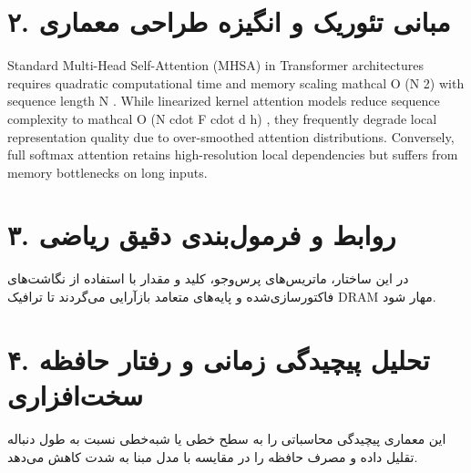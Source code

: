 \documentclass[12pt,a4paper]{article}
\begin{document}
\section*{۲. مبانی تئوریک و انگیزه طراحی معماری}
Standard Multi-Head Self-Attention (MHSA) in Transformer architectures requires quadratic computational time and memory scaling mathcal O (N 2) with sequence length N . While linearized kernel attention models reduce sequence complexity to mathcal O (N cdot F cdot d h) , they frequently degrade local representation quality due to over-smoothed attention distributions. Conversely, full softmax attention retains high-resolution local dependencies but suffers from memory bottlenecks on long inputs.

\section*{۳. روابط و فرمول‌بندی دقیق ریاضی}
در این ساختار، ماتریس‌های پرس‌وجو، کلید و مقدار با استفاده از نگاشت‌های فاکتورسازی‌شده و پایه‌های متعامد بازآرایی می‌گردند تا ترافیک DRAM مهار شود.

\section*{۴. تحلیل پیچیدگی زمانی و رفتار حافظه سخت‌افزاری}
این معماری پیچیدگی محاسباتی را به سطح خطی یا شبه‌خطی نسبت به طول دنباله تقلیل داده و مصرف حافظه را در مقایسه با مدل مبنا به شدت کاهش می‌دهد.
\end{document}
